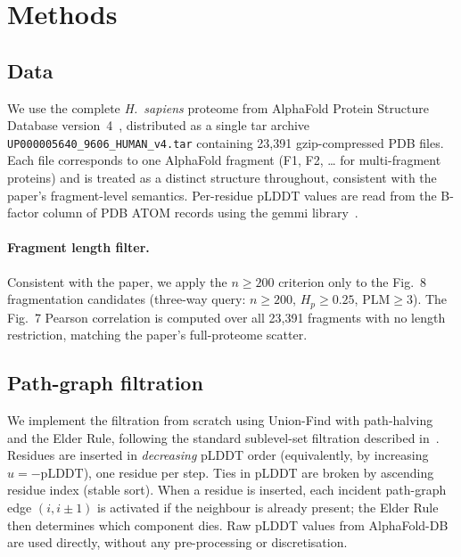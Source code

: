 \section{Methods}
\label{sec:methods}

\subsection{Data}
\label{sec:methods_data}

We use the complete \textit{H.~sapiens} proteome from AlphaFold Protein
Structure Database version~4~\cite{varadi2022alphafold}, distributed as a
single tar archive \texttt{UP000005640\_9606\_HUMAN\_v4.tar} containing
23{,}391 gzip-compressed PDB files.
Each file corresponds to one AlphaFold fragment (F1, F2, \ldots{} for
multi-fragment proteins) and is treated as a distinct structure throughout,
consistent with the paper's fragment-level semantics.
Per-residue pLDDT values are read from the B-factor column of PDB ATOM
records using the gemmi library~\cite{wojdyr2022gemmi}.

\paragraph{Fragment length filter.}
Consistent with the paper, we apply the $n \geq 200$ criterion only to
the Fig.~8 fragmentation candidates (three-way query: $n \geq 200$,
$H_p \geq 0.25$, $\mathrm{PLM} \geq 3$).
The Fig.~7 Pearson correlation is computed over all 23{,}391 fragments
with no length restriction, matching the paper's full-proteome scatter.

\subsection{Path-graph filtration}
\label{sec:methods_filt}

We implement the filtration from scratch using Union-Find with path-halving
and the Elder Rule, following the standard sublevel-set filtration described
in~\cite{cazals2025alphafold}.
Residues are inserted in \emph{decreasing} pLDDT order (equivalently,
by increasing $u = -\mathrm{pLDDT}$), one residue per step.
Ties in pLDDT are broken by ascending residue index (stable sort).
When a residue is inserted, each incident path-graph edge $(i, i\pm 1)$ is
activated if the neighbour is already present; the Elder Rule then determines
which component dies.
Raw pLDDT values from AlphaFold-DB are used directly, without any
pre-processing or discretisation.

